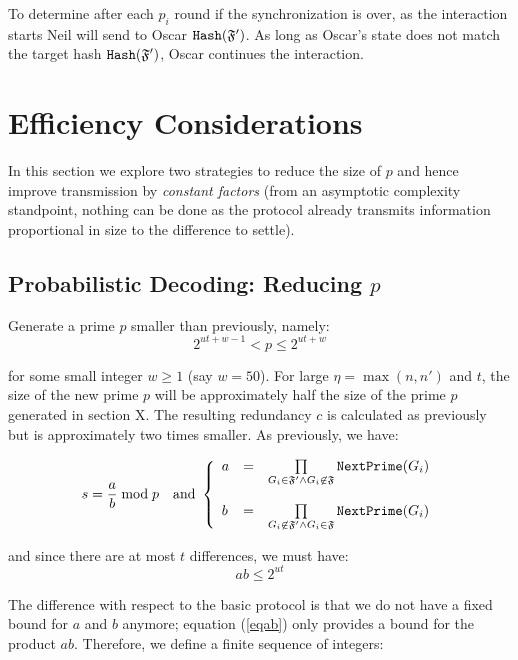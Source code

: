 \documentclass[11pt]{llncs}
\begin{document}
To determine after each $p_i$ round if the synchronization is over, as the interaction starts Neil will send to Oscar $\mbox{{\tt Hash}}(\mathfrak{F}')$. As long as Oscar's state does not match the target hash $\mbox{{\tt Hash}}(\mathfrak{F}')$, Oscar continues the interaction.

\section{Efficiency Considerations}

In this section we explore two strategies to reduce the size of $p$ and hence improve transmission by {\sl constant factors} (from an asymptotic complexity standpoint, nothing can be done as the protocol already transmits information proportional in size to the difference to settle).

\subsection{Probabilistic Decoding: Reducing $p$}

Generate a prime $p$ smaller than previously, namely:
\begin{equation}
\label{eqnewp}
2^{ut+w-1}<p \leq 2^{ut+w}
\end{equation}

for some small integer $w \geq 1$ (say $w=50$). For large $\eta=\max(n,n')$ and $t$, the size of the new prime $p$ will be approximately half the size of the prime $p$ generated in section X. The resulting redundancy $c$ is calculated as previously but is approximately two times smaller. As previously, we have:

$$
s=\frac{a}{b} \bmod p{~~~\mbox{and~}}
\left\{
\begin{array}{lcr}
a & =&  \prod\limits_{G_i \in \mathfrak{F}'\wedge G_i \not\in\mathfrak{F}} \mbox{{\tt NextPrime}}(G_i) \\
\\
b & = & \prod\limits_{G_i \not\in\mathfrak{F}' \wedge G_i \in\mathfrak{F}} \mbox{{\tt NextPrime}}(G_i)
\end{array}
\right.
$$

and since there are at most $t$ differences, we must have:
\begin{equation}
\label{eqab}
a b \leq 2^{ut}
\end{equation}

The difference with respect to the basic protocol is that we do not have a fixed bound for $a$ and $b$ anymore; equation (\ref{eqab}) only provides a bound for the product $a b$. Therefore, we define a finite sequence of integers:
\end{document}
